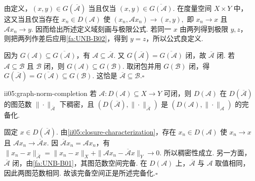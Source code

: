 \begin{FAProof}
由定义，\(\displaystyle(x,y)\in G(\overline{\mathcal A})\) 当且仅当 \(\displaystyle(x,y)\in\overline{G(\mathcal A)}\). 在度量空间 \(\displaystyle X\times Y\) 中，这又当且仅当存在 \(\displaystyle x_n\in D(\mathcal A)\) 使
\(\displaystyle (x_n,\mathcal Ax_n)\to(x,y),\)
即 \(\displaystyle x_n\to x\) 且 \(\displaystyle\mathcal Ax_n\to y\). 因而给出所述定义域刻画与极限公式. 若同一 \(\displaystyle x\) 由两列得到极限 \(\displaystyle y,z\)，则把两列作差后应用\autoref{fa:UNB-B02}，得到 \(\displaystyle y=z\)，所以公式良定义.

因为 \(\displaystyle G(\mathcal A)\subseteq\overline{G(\mathcal A)}\)，有 \(\displaystyle\mathcal A\subseteq\overline{\mathcal A}\). 又 \(\displaystyle G(\overline{\mathcal A})=\overline{G(\mathcal A)}\) 闭，故 \(\displaystyle\overline{\mathcal A}\) 闭. 若 \(\displaystyle\mathcal A\subseteq\mathcal B\) 且 \(\displaystyle\mathcal B\) 闭，则
\(\displaystyle G(\mathcal A)\subseteq G(\mathcal B).\)
取闭包并用 \(\displaystyle G(\mathcal B)\) 闭，得
\(\displaystyle G(\overline{\mathcal A}) = \overline{G(\mathcal A)} \subseteq G(\mathcal B).\)
这恰是 \(\displaystyle\overline{\mathcal A}\subseteq\mathcal B\).\hfill\(\square\)
\end{FAProof}

\begin{FAProposition}[C][可闭算子的图范数完备化]{ii05:graph-norm-completion}
若 \(\displaystyle\mathcal A:D(\mathcal A)\subseteq X\to Y\) 可闭，则 \(\displaystyle D(\mathcal A)\) 在 \(\displaystyle D(\overline{\mathcal A})\) 的图范数 \(\displaystyle\|\cdot\|_{\overline{\mathcal A}}\) 下稠密，且
\(\displaystyle (D(\overline{\mathcal A}),\|\cdot\|_{\overline{\mathcal A}})\)
是
\(\displaystyle (D(\mathcal A),\|\cdot\|_{\mathcal A})\)
的完备化.
\end{FAProposition}

\begin{FAProof}
固定 \(\displaystyle x\in D(\overline{\mathcal A})\). 由\autoref{ii05:closure-characterization}，存在 \(\displaystyle x_n\in D(\mathcal A)\) 使 \(\displaystyle x_n\to x\) 且 \(\displaystyle\mathcal Ax_n\to\overline{\mathcal A}x\). 因 \(\displaystyle\overline{\mathcal A}x_n=\mathcal Ax_n\)，有
\(\displaystyle \|x_n-x\|_{\overline{\mathcal A}} = \|x_n-x\|_X+\|\mathcal Ax_n-\overline{\mathcal A}x\|_Y \longrightarrow0.\)
所以稠密性成立. 另一方面，\(\displaystyle\overline{\mathcal A}\) 闭，由\autoref{fa:UNB-B01}，其图范数空间完备. 在 \(\displaystyle D(\mathcal A)\) 上，\(\displaystyle\overline{\mathcal A}\) 与 \(\displaystyle\mathcal A\) 取值相同，因此两图范数相同. 故该完备空间正是所述完备化.\hfill\(\square\)
\end{FAProof}

